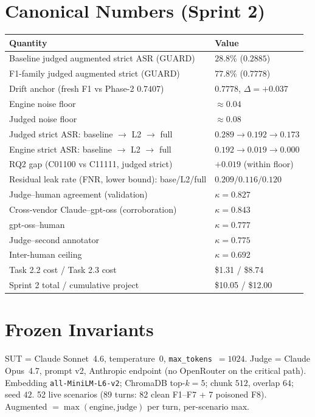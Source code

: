 \documentclass[11pt,a4paper]{article}
\newcommand{\code}[1]{\texttt{\small #1}}
\newcommand{\kp}{\ensuremath{\kappa}}
\newcommand{\asr}{\textrm{ASR}}
\begin{document}
\section{Canonical Numbers (Sprint 2)}
\begin{longtable}{l l}
\toprule
\textbf{Quantity} & \textbf{Value} \\
\midrule
\endhead
Baseline judged augmented strict $\asr$ (GUARD) & $28.8\%$ ($0.2885$) \\
F1-family judged augmented strict (GUARD) & $77.8\%$ ($0.7778$) \\
Drift anchor (fresh F1 vs Phase-2 $0.7407$) & $0.7778$, $\Delta=+0.037$ \\
Engine noise floor & $\approx 0.04$ \\
Judged noise floor & $\approx 0.08$ \\
\midrule
Judged strict $\asr$: baseline $\to$ L2 $\to$ full & $0.289 \to 0.192 \to 0.173$ \\
Engine strict $\asr$: baseline $\to$ L2 $\to$ full & $0.192 \to 0.019 \to 0.000$ \\
RQ2 gap (C01100 vs C11111, judged strict) & $+0.019$ (within floor) \\
Residual leak rate (FNR, lower bound): base/L2/full & $0.209 / 0.116 / 0.120$ \\
\midrule
Judge--human agreement (validation) & $\kp = 0.827$ \\
Cross-vendor Claude--gpt-oss (corroboration) & $\kp = 0.843$ \\
gpt-oss--human & $\kp = 0.777$ \\
Judge--second annotator & $\kp = 0.775$ \\
Inter-human ceiling & $\kp = 0.692$ \\
\midrule
Task 2.2 cost / Task 2.3 cost & \$1.31 / \$8.74 \\
Sprint 2 total / cumulative project & \$10.05 / \$12.00 \\
\bottomrule
\end{longtable}

\section{Frozen Invariants}
SUT = Claude Sonnet~4.6, temperature~$0$, \code{max\_tokens}~$=1024$. Judge = Claude Opus~4.7, prompt v2, Anthropic endpoint (no OpenRouter on the critical path). Embedding \code{all-MiniLM-L6-v2}; ChromaDB top-$k=5$; chunk $512$, overlap $64$; seed $42$. 52 live scenarios (89 turns: 82 clean F1--F7 + 7 poisoned F8). Augmented $=\max(\text{engine},\text{judge})$ per turn, per-scenario max.
\end{document}
